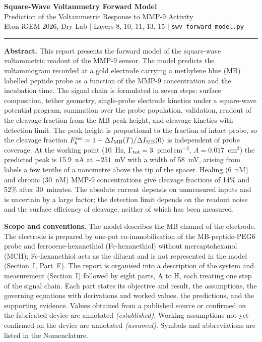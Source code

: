\documentclass[10pt,a4paper]{article}
\numberwithin{equation}{section}
\newcommand{\DI}{\Delta I}
\newcommand{\Fkrec}{F_k^{\rm rec}}
\newcommand{\Grtot}{\Gamma_{\rm tot}}
\newcommand{\FLAG}{\textit{(assumed)}}
\newcommand{\CONF}{\textit{(established)}}
\newcommand{\fkChronThirty}{52}
\newcommand{\fkHealThirty}{14}
\newcommand{\fwhmMV}{58}
\newcommand{\gammaZero}{3}
\newcommand{\peakEmV}{\ensuremath{-251}}
\newcommand{\peakNA}{15.9}
\begin{document}
\begin{center}
{\LARGE\bfseries Square-Wave Voltammetry Forward Model}\\[0.4em]
{\large Prediction of the Voltammetric Response to MMP-9 Activity}\\[0.25em]
{\small\color{gray}
Eton iGEM 2026, Dry Lab \quad$|$\quad
Layers 8, 10, 11, 13, 15 \quad$|$\quad
\texttt{swv\_forward\_model.py}}
\end{center}
\vspace{0.4em}\hrule\vspace{0.7em}

\noindent\textbf{Abstract.}
This report presents the forward model of the square-wave voltammetric
readout of the MMP-9 sensor. The model predicts the voltammogram recorded at a
gold electrode carrying a methylene blue (MB) labelled peptide probe as a
function of the MMP-9 concentration and the incubation time. The signal chain is
formulated in seven steps: surface composition, tether geometry, single-probe
electrode kinetics under a square-wave potential program, summation over the
probe population, validation, readout of the cleavage fraction from the MB peak
height, and cleavage kinetics with detection limit. The peak height is
proportional to the fraction of intact probe, so the cleavage fraction
$\Fkrec=1-\DI_{\rm MB}(T)/\DI_{\rm MB}(0)$ is independent of probe coverage.
At the working point (10~Hz, $\Grtot=\gammaZero$~pmol\,cm$^{-2}$,
$A=0.017$~cm$^2$) the predicted peak is \peakNA~nA at \peakEmV~mV with a width of
\fwhmMV~mV, arising from labels a few tenths of a nanometre above the tip of the
spacer. Healing (6~nM) and chronic (30~nM) MMP-9 concentrations give cleavage
fractions of \fkHealThirty\% and \fkChronThirty\% after 30~minutes. The absolute current depends on
unmeasured inputs and is uncertain by a large factor; the detection limit depends on the
readout noise and the surface efficiency of cleavage, neither of which has been measured.

\noindent\textbf{Scope and conventions.}
The model describes the MB channel of the electrode. The electrode is prepared
by one-pot co-immobilisation of the MB-peptide-PEG6 probe and ferrocene-hexanethiol
(Fc-hexanethiol) without mercaptohexanol (MCH); Fc-hexanethiol acts as the diluent
and is not represented in the model (Section~I, Part~F). The report is organised
into a description of the system and measurement (Section~I) followed by eight
parts, A to H, each treating one step of the signal chain. Each part states its
objective and result, the assumptions, the governing equations with derivations
and worked values, the predictions, and the supporting evidence. Values obtained
from a published source or confirmed on the fabricated device are annotated
\CONF. Working assumptions not yet confirmed on the device are annotated
\FLAG. Symbols and abbreviations are listed in the Nomenclature.
\end{document}
